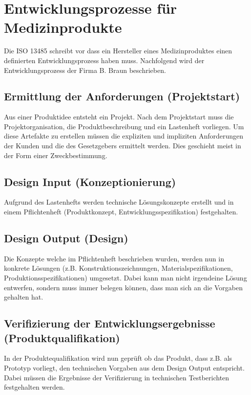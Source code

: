 \chapter{Entwicklungsprozesse für Medizinprodukte}
\label{sec:produktentwicklung}

Die ISO 13485 schreibt vor dass ein Hersteller eines Medizinproduktes einen definierten Entwicklungsprozess haben muss. Nachfolgend wird der Entwicklungsprozess der Firma B. Braun beschrieben.

\section{Ermittlung der Anforderungen (Projektstart)}

Aus einer Produktidee entsteht ein Projekt. Nach dem Projektstart muss die Projektorganisation, die Produktbeschreibung und ein Lastenheft vorliegen. Um diese Artefakte zu erstellen müssen die expliziten und impliziten Anforderungen der Kunden und die des Gesetzgebers ermittelt werden. Dies geschieht meist in der Form einer Zweckbestimmung.

\section{Design Input (Konzeptionierung)}

Aufgrund des Lastenhefts werden technische Lösungskonzepte erstellt und in einem Pflichtenheft (Produktkonzept, Entwicklungsspezifikation) festgehalten.

\section{Design Output (Design)}

Die Konzepte welche im Pflichtenheft beschrieben wurden, werden nun in konkrete Lösungen (z.B. Konstruktionszeichnungen, Materialspezifikationen, Produktionsspezifikationen) umgesetzt. Dabei kann man nicht irgendeine Lösung entwerfen, sondern muss immer belegen können, dass man sich an die Vorgaben gehalten hat.

\section{Verifizierung der Entwicklungsergebnisse (Produktqualifikation)}

In der Produktequalifikation wird nun geprüft ob das Produkt, dass z.B. als Prototyp vorliegt, den technischen Vorgaben aus dem Design Output entspricht. Dabei müssen die Ergebnisse der Verifizierung in technischen Testberichten festgehalten werden.

